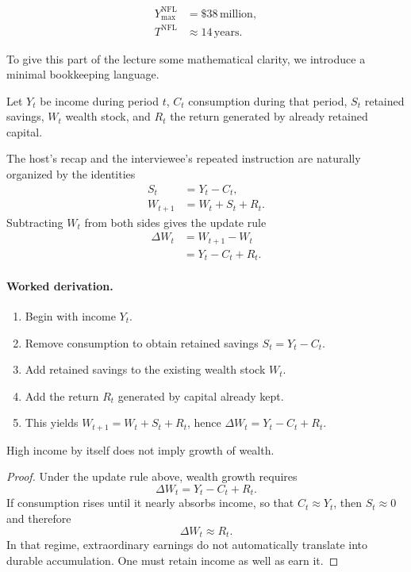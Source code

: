 \begin{align}
Y_{\max}^{\mathrm{NFL}} &= \$38\,\text{million},\\
T^{\mathrm{NFL}} &\approx 14\,\text{years}.
\end{align}

To give this part of the lecture some mathematical clarity, we introduce a minimal bookkeeping language.

\begin{definition}
Let \(Y_t\) be income during period \(t\), \(C_t\) consumption during that period, \(S_t\) retained savings, \(W_t\) wealth stock, and \(R_t\) the return generated by already retained capital.
\end{definition}

The host's recap and the interviewee's repeated instruction are naturally organized by the identities
\begin{align}
S_t &= Y_t - C_t,\\
W_{t+1} &= W_t + S_t + R_t.
\end{align}
Subtracting \(W_t\) from both sides gives the update rule
\begin{align}
\Delta W_t &= W_{t+1} - W_t \\
&= Y_t - C_t + R_t.
\end{align}

\paragraph{Worked derivation.}
\begin{enumerate}
\item Begin with income \(Y_t\).
\item Remove consumption to obtain retained savings \(S_t = Y_t - C_t\).
\item Add retained savings to the existing wealth stock \(W_t\).
\item Add the return \(R_t\) generated by capital already kept.
\item This yields \(W_{t+1} = W_t + S_t + R_t\), hence \(\Delta W_t = Y_t - C_t + R_t\).
\end{enumerate}

\begin{proposition}
High income by itself does not imply growth of wealth.
\end{proposition}

\begin{proof}
Under the update rule above, wealth growth requires
\[
\Delta W_t = Y_t - C_t + R_t.
\]
If consumption rises until it nearly absorbs income, so that \(C_t \approx Y_t\), then \(S_t \approx 0\) and therefore
\[
\Delta W_t \approx R_t.
\]
In that regime, extraordinary earnings do not automatically translate into durable accumulation. One must retain income as well as earn it.
\end{proof}

